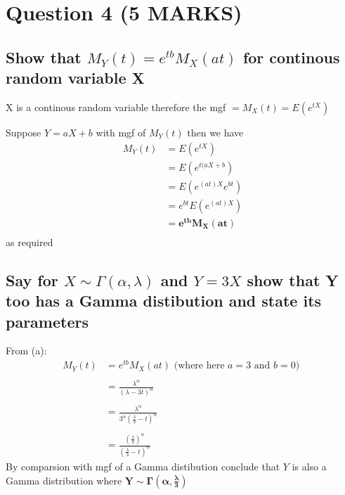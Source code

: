 \documentclass[11pt]{article}
\begin{document}
\section{Question 4 (5 MARKS)}
\subsection{Show that $M_{Y}(t)=e^{tb}M_{X}(at)$ for continous random variable X}
X is a continous random variable therefore the mgf $ = M_{X}(t) = E(e^{tX})$

Suppose $Y=aX+b$ with mgf of $M_{Y}(t)$ then we have
\begin{align*}
    M_{Y}(t) &=  E(e^{tX}) \\
             &=  E(e^{t(aX+b}) \\
             &=  E(e^{(at)X} e^{bt}) \\
             &=  e^{bt}E(e^{(at)X}) \\
             &=  \boxed{\bm{e^{tb}M_{X}(at)}} \\
\end{align*}
as required
\subsection{Say for $X \sim \Gamma(\alpha,\lambda)$ and $Y=3X$ show that Y too has a Gamma distibution and state its parameters}
From (a):
\begin{align*}
    M_{Y}(t) &= e^{tb}M_{X}(at) \text{ (where here $a=3$ and $b=0$) } \\ \\
             &= \frac{\lambda^{\alpha}}{(\lambda -3t)^{\alpha}} \\ \\
             &= \frac{\lambda^{\alpha}}{3^{\alpha}(\frac{\lambda}{3} -t)^{\alpha}} \\ \\
             &= \frac{(\frac{\lambda}{3})^{\alpha}}{(\frac{\lambda}{3} -t)^{\alpha}}
\end{align*}
By comparsion with mgf of a Gamma distibution conclude that $Y$ is also a Gamma distribution where $\boxed{\bm{Y \sim \Gamma(\alpha,\frac{\lambda}{3})}}$
\end{document}
